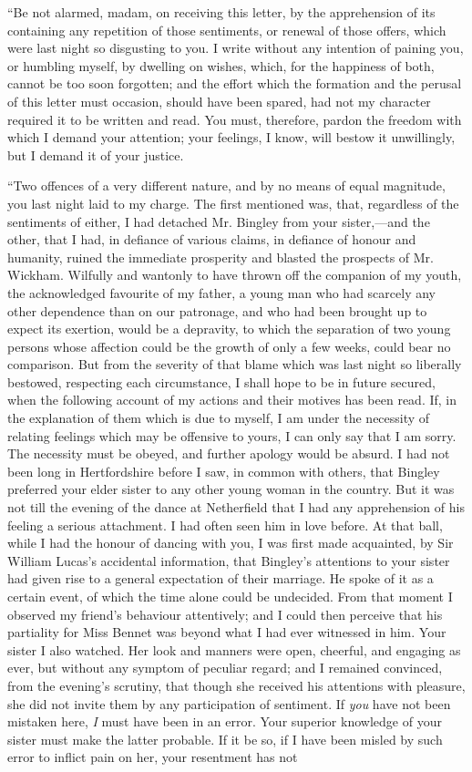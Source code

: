 \documentclass[12pt]{book}
\begin{document}
``Be not alarmed, madam, on receiving this letter, by the apprehension of its containing any repetition of those sentiments, or renewal of those offers, which were last night so disgusting to you. I write without any intention of paining you, or humbling myself, by dwelling on wishes, which, for the happiness of both, cannot be too soon forgotten; and the effort which the formation and the perusal of this letter must occasion, should have been spared, had not my character required it to be written and read. You must, therefore, pardon the freedom with which I demand your attention; your feelings, I know, will bestow it unwillingly, but I demand it of your justice.

``Two offences of a very different nature, and by no means of equal magnitude, you last night laid to my charge. The first mentioned was, that, regardless of the sentiments of either, I had detached Mr. Bingley from your sister,---and the other, that I had, in defiance of various claims, in defiance of honour and humanity, ruined the immediate prosperity and blasted the prospects of Mr. Wickham. Wilfully and wantonly to have thrown off the companion of my youth, the acknowledged favourite of my father, a young man who had scarcely any other dependence than on our patronage, and who had been brought up to expect its exertion, would be a depravity, to which the separation of two young persons whose affection could be the growth of only a few weeks, could bear no comparison. But from the severity of that blame which was last night so liberally bestowed, respecting each circumstance, I shall hope to be in future secured, when the following account of my actions and their motives has been read. If, in the explanation of them which is due to myself, I am under the necessity of relating feelings which may be offensive to yours, I can only say that I am sorry. The necessity must be obeyed, and further apology would be absurd. I had not been long in Hertfordshire before I saw, in common with others, that Bingley preferred your elder sister to any other young woman in the country. But it was not till the evening of the dance at Netherfield that I had any apprehension of his feeling a serious attachment. I had often seen him in love before. At that ball, while I had the honour of dancing with you, I was first made acquainted, by Sir William Lucas's accidental information, that Bingley's attentions to your sister had given rise to a general expectation of their marriage. He spoke of it as a certain event, of which the time alone could be undecided. From that moment I observed my friend's behaviour attentively; and I could then perceive that his partiality for Miss Bennet was beyond what I had ever witnessed in him. Your sister I also watched. Her look and manners were open, cheerful, and engaging as ever, but without any symptom of peculiar regard; and I remained convinced, from the evening's scrutiny, that though she received his attentions with pleasure, she did not invite them by any participation of sentiment. If \textit{you} have not been mistaken here, \textit{I} must have been in an error. Your superior knowledge of your sister must make the latter probable. If it be so, if I have been misled by such error to inflict pain on her, your resentment has not 
\end{document}
